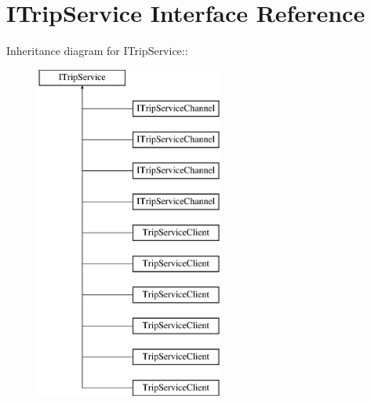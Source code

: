 \hypertarget{interface_i_trip_service}{
\section{ITripService Interface Reference}
\label{interface_i_trip_service}
}
Inheritance diagram for ITripService::\begin{figure}[H]
\begin{center}
\leavevmode
\includegraphics[height=11cm]{interface_i_trip_service}
\end{center}
\end{figure}
